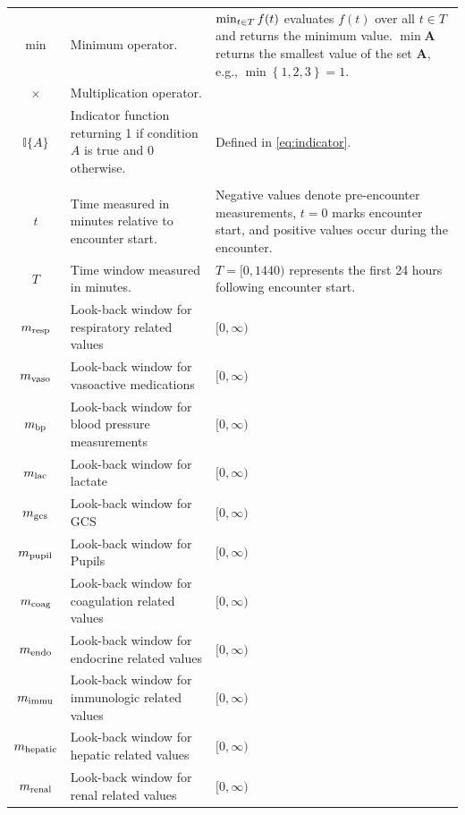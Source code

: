 \documentclass[letterpaper,10pt]{article}
\begin{document}
\begin{longtable}{c p{2.1in} p{2.7in}}
    \rowcolor{gray!20}
    $\min$ &
    Minimum operator. &
    $\min_{t \in T} f(t)$ evaluates $f(t)$ over all
    $t \in T$ and returns the minimum value. $\min \boldsymbol{A}$
    returns the smallest value of the set $\boldsymbol{A}$, e.g., $\min\left\{1,
    2, 3\right\} = 1.$ \\

    $\times$ &
    Multiplication operator. &
    \\

    \rowcolor{gray!20}
    $\mathbb{I}\{A\}$ & Indicator function returning 1 if condition $A$ is true
    and 0 otherwise. & Defined in \eqref{eq:indicator}.\\

  \addlinespace[0.5em]
  \multicolumn{3}{l}{\textbf{Time and Indexing}} \\

    $t$ &
    Time measured in minutes relative to encounter start. &
    Negative values denote pre-encounter measurements,
    $t=0$ marks encounter start, and positive values occur during the encounter. \\

    \rowcolor{gray!20}
    $T$ &
    Time window measured in minutes. &
    $T=[0,1440)$ represents the first 24 hours following encounter start. \\

    $m_{\mathrm{resp}}$  & Look-back window for respiratory related values & $[0, \infty)$\\
    \rowcolor{gray!20}
    $m_{\mathrm{vaso}}$  & Look-back window for vasoactive medications & $[0, \infty)$\\
    $m_{\mathrm{bp}}$   & Look-back window for blood pressure measurements & $[0, \infty)$\\
    \rowcolor{gray!20}
    $m_{\mathrm{lac}}$   & Look-back window for lactate & $[0, \infty)$\\
    $m_{\mathrm{gcs}}$   & Look-back window for GCS & $[0, \infty)$\\
    \rowcolor{gray!20}
    $m_{\mathrm{pupil}}$ & Look-back window for Pupils & $[0, \infty)$\\
    $m_{\mathrm{coag}}$  & Look-back window for coagulation related values & $[0, \infty)$\\
    $m_{\mathrm{endo}}$  & Look-back window for endocrine related values & $[0, \infty)$\\
    $m_{\mathrm{immu}}$  & Look-back window for immunologic related values & $[0, \infty)$\\
    $m_{\mathrm{hepatic}}$  & Look-back window for hepatic related values & $[0, \infty)$\\
    $m_{\mathrm{renal}}$  & Look-back window for renal related values & $[0, \infty)$\\


\end{longtable}
\end{document}
